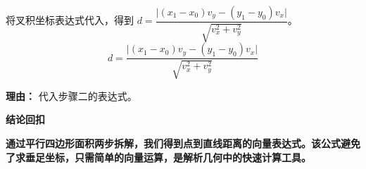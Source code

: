 \begin{proofbox}
\begin{description}[style=nextline, leftmargin=2.8em, labelsep=0.5em, itemsep=0.55em]
		\item[\textbf{步骤七（坐标形式）：}] 将叉积坐标表达式代入，得到 $d = \dfrac{\lvert (x_1-x_0)v_y - (y_1-y_0)v_x \rvert}{\sqrt{v_x^2+v_y^2}}$。
			\[
				d = \frac{\lvert (x_1-x_0)v_y - (y_1-y_0)v_x \rvert}{\sqrt{v_x^2+v_y^2}}
			\]
			\par\textbf{理由：} 代入步骤二的表达式。
	\end{description}

	\medskip
	\textbf{\textcolor{CProof}{结论回扣}}

	\textbf{通过平行四边形面积两步拆解，我们得到点到直线距离的向量表达式。该公式避免了求垂足坐标，只需简单的向量运算，是解析几何中的快速计算工具。}
\end{proofbox}
